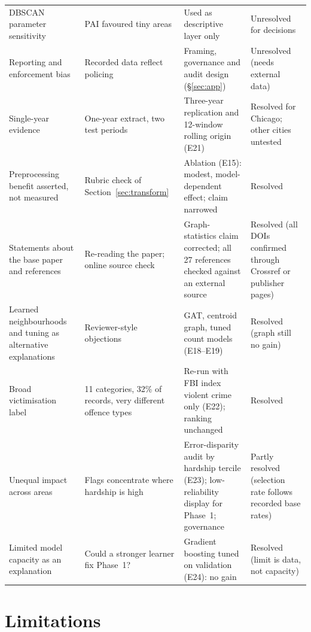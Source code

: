 \documentclass[11pt,a4paper]{report}
\begin{document}
\begin{table}[H]
\begin{tabularx}{\textwidth}{@{}L{2.5cm} Y Y L{1.7cm}@{}}
DBSCAN parameter sensitivity & PAI favoured tiny areas & Used as descriptive layer only & Unresolved for decisions\\
Reporting and enforcement bias & Recorded data reflect policing & Framing, governance and audit design (\S\ref{sec:app}) & Unresolved (needs external data)\\
Single-year evidence & One-year extract, two test periods & Three-year replication and 12-window rolling origin (E21) & Resolved for Chicago; other cities untested\\
Preprocessing benefit asserted, not measured & Rubric check of Section~\ref{sec:transform} & Ablation (E15): modest, model-dependent effect; claim narrowed & Resolved\\
Statements about the base paper and references & Re-reading the paper; online source check & Graph-statistics claim corrected; all 27 references checked against an external source & Resolved (all DOIs confirmed through Crossref or publisher pages)\\
Learned neighbourhoods and tuning as alternative explanations & Reviewer-style objections & GAT, centroid graph, tuned count models (E18--E19) & Resolved (graph still no gain)\\
Broad victimisation label & 11 categories, 32\% of records, very different offence types & Re-run with FBI index violent crime only (E22); ranking unchanged & Resolved\\
Unequal impact across areas & Flags concentrate where hardship is high & Error-disparity audit by hardship tercile (E23); low-reliability display for Phase~1; governance & Partly resolved (selection rate follows recorded base rates)\\
Limited model capacity as an explanation & Could a stronger learner fix Phase~1? & Gradient boosting tuned on validation (E24): no gain & Resolved (limit is data, not capacity)\\
\bottomrule
\end{tabularx}
\end{table}

\section{Limitations}
\label{sec:limits}
\end{document}
